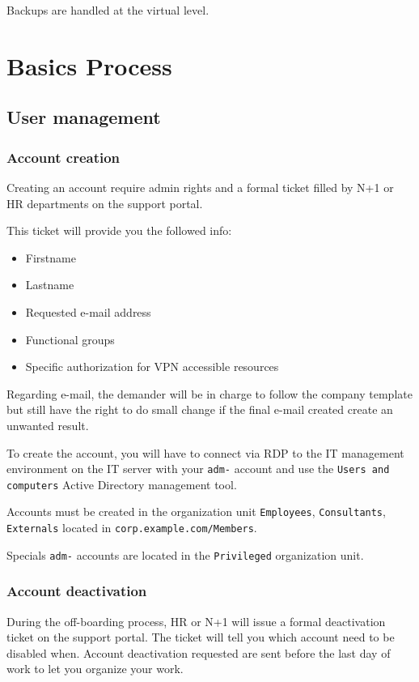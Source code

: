 \documentclass{demo}
\begin{document}
Backups are handled at the virtual level.

\chapter{Basics Process}

\section{User management}

\subsection{Account creation}

Creating an account require admin rights and a formal ticket filled by N+1 or HR departments on the support portal.

This ticket will provide you the followed info:
\begin{itemize}
  \item Firstname
  \item Lastname
  \item Requested e-mail address
  \item Functional groups
  \item Specific authorization for VPN accessible resources
\end{itemize}

Regarding e-mail, the demander will be in charge to follow the company template but still have the right to do small change if the final e-mail created create an unwanted result.

To create the account, you will have to connect via RDP to the IT management environment on the IT server with your \texttt{adm-} account and use the \texttt{Users and computers} Active Directory management tool.

Accounts must be created in the organization unit \texttt{Employees}, \texttt{Consultants}, \texttt{Externals} located in \texttt{corp.example.com/Members}.

Specials \texttt{adm-} accounts are located in the \texttt{Privileged} organization unit.

\subsection{Account deactivation}

During the off-boarding process, HR or N+1 will issue a formal deactivation ticket on the support portal. The ticket will tell you which account need to be disabled when. Account deactivation requested are sent before the last day of work to let you organize your work.
\end{document}
